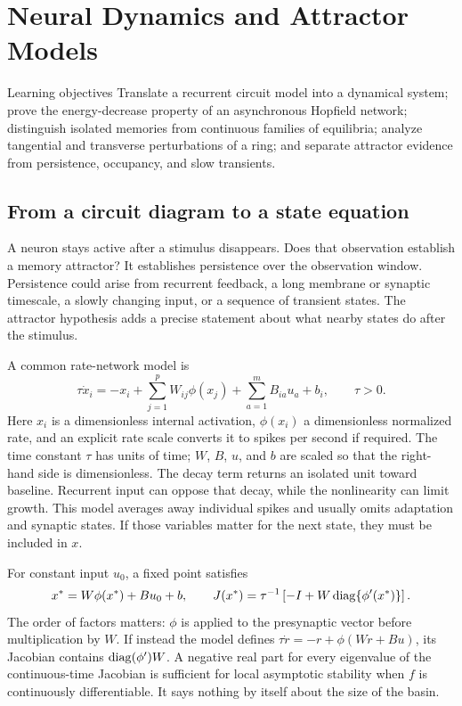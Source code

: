 \chapter{Neural Dynamics and Attractor Models}\label{ch:07}

\begin{insight}{Learning objectives}
Translate a recurrent circuit model into a dynamical system; prove the energy-decrease property of an asynchronous Hopfield network; distinguish isolated memories from continuous families of equilibria; analyze tangential and transverse perturbations of a ring; and separate attractor evidence from persistence, occupancy, and slow transients.
\end{insight}

\section{From a circuit diagram to a state equation}
A neuron stays active after a stimulus disappears. Does that observation establish a memory attractor? It establishes persistence over the observation window. Persistence could arise from recurrent feedback, a long membrane or synaptic timescale, a slowly changing input, or a sequence of transient states. The attractor hypothesis adds a precise statement about what nearby states do after the stimulus.

A common rate-network model is
\begin{equation}
 \tau\dot x_i=-x_i+\sum_{j=1}^pW_{ij}\phi(x_j)
                  +\sum_{a=1}^m B_{ia}u_a+b_i,
 \qquad \tau>0.\label{eq:07-rate}
\end{equation}
Here $x_i$ is a dimensionless internal activation, $\phi(x_i)$ a dimensionless normalized rate, and an explicit rate scale converts it to spikes per second if required. The time constant $\tau$ has units of time; $W$, $B$, $u$, and $b$ are scaled so that the right-hand side is dimensionless. The decay term returns an isolated unit toward baseline. Recurrent input can oppose that decay, while the nonlinearity can limit growth. This model averages away individual spikes and usually omits adaptation and synaptic states. If those variables matter for the next state, they must be included in $x$.

For constant input $u_0$, a fixed point satisfies
\begin{equation}
 x^*=W\phi(x^*)+Bu_0+b,
 \qquad J(x^*)=\tau^{-1}\left[-I+W\operatorname{diag}\{\phi'(x^*)\}\right].
 \label{eq:07-rate-jac}
\end{equation}
The order of factors matters: $\phi$ is applied to the presynaptic vector before multiplication by $W$. If instead the model defines $\tau\dot r=-r+\phi(Wr+Bu)$, its Jacobian contains $\operatorname{diag}(\phi')W$. A negative real part for every eigenvalue of the continuous-time Jacobian is sufficient for local asymptotic stability when $f$ is continuously differentiable. It says nothing by itself about the size of the basin.

